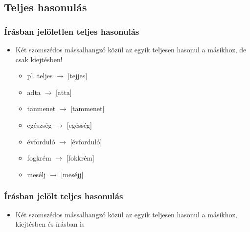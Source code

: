 \documentclass{article}
\begin{document}
\subsection{Teljes hasonulás}


\subsubsection{Írásban jelöletlen teljes hasonulás}
\begin{itemize}
    \item Két szomszédos mássalhangzó közül az egyik teljesen hasonul a másikhoz, de csak kiejtésben! \begin{itemize}
        \item pl. teljes $\rightarrow$ [tejjes]
        \item adta $\rightarrow$ [atta]
        \item tanmenet $\rightarrow$ [tammenet]
        \item egészség $\rightarrow$ [egésség]
        \item évforduló $\rightarrow$ [évforduló]
        \item fogkrém $\rightarrow$ [fokkrém]
        \item mesélj $\rightarrow$ [meséjj]
    \end{itemize}
\end{itemize}


\subsubsection{Írásban jelölt teljes hasonulás}
\begin{itemize}
    \item Két szomszédos mássalhangzó közül az egyik teljesen hasonul a másikhoz, kiejtésben és írásban is
\end{itemize}
\end{document}
